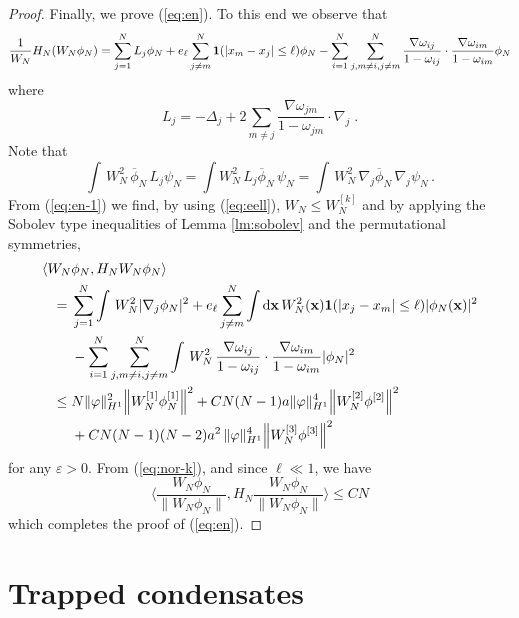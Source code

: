 \documentclass[11pt]{article}
\newcommand{\rd}{{\rm d}}
\newcommand{\bx}{{\bf x}}
\newcommand{\ph}{\varphi}
\newcommand{\e}{\varepsilon}
\begin{document}
\begin{proof}
Finally, we prove (\ref{eq:en}). To this end we observe that
\begin{equation}\label{eq:en-1}
\frac{1}{W_N} H_N (W_N \phi_N) = \sum_{j=1}^N L_j \phi_N + e_{\ell}
\sum_{j \neq m}^N  {\bf 1} (|x_m -x_j| \leq \ell) \phi_N -
\sum_{i=1}^N \sum_{j,m \neq i, j\neq m}^N
\frac{\nabla\omega_{ij}}{1-\omega_{ij}} \cdot
\frac{\nabla\omega_{im}}{1-\omega_{im}} \phi_N \end{equation}
 where
\[ L_j = -\Delta_j + 2\sum_{m \neq j}
\frac{\nabla\omega_{jm}}{1-\omega_{jm}} \cdot \nabla_j \; .\] Note
that
\[
\int \, W_N^2 \, \overline{\phi}_N \, L_j \psi_N  = \int  W_N^2 \,
L_j \overline{\phi}_N \, \psi_N = \int \, W_N^2  \, \nabla_j
\overline{\phi}_N \, \nabla_j \psi_N \,.
\]
{F}rom (\ref{eq:en-1}) we find, by using (\ref{eq:eell}), $W_N\leq
W_N^{[k]}$ and by applying the Sobolev type inequalities of Lemma
\ref{lm:sobolev} and the permutational symmetries,
\begin{equation}
\begin{split}
\langle W_N &\phi_N, H_N W_N \phi_N \rangle  \\ = \; &\sum_{j=1}^N
\int  \, W_N^2  |\nabla_j \phi_N |^2 + e_{\ell}
\sum_{j\neq m}^N \int \rd \bx \, W_N^2 (\bx) {\bf 1} (|x_j -x_m|
\leq \ell) |\phi_N(\bx)|^2 \\& - \sum_{i=1}^N \sum_{j,m \neq i,
j\neq m}^N \int  \, W_N^2  \,
\frac{\nabla\omega_{ij}}{1-\omega_{ij}} \cdot
\frac{\nabla\omega_{im}}{1-\omega_{im}} |\phi_N |^2 \\
\leq \;&N \| \ph \|_{H^1}^2 \Big\| W_N^{[1]} \phi_N^{[1]} \Big\|^2 +
C N(N-1) a \| \ph \|_{H^1}^4 \Big\| W^{[2]}_N\phi^{[2]}\Big\|^2 \\
&+ CN(N-1)(N-2) a^2 \, \| \ph \|_{H^1}^4 \Big\|
W^{[3]}_N\phi^{[3]}\Big\|^2
\end{split}
\end{equation}
for any $\e >0$. {F}rom (\ref{eq:nor-k}), and since $\ell \ll 1$, we
have
\begin{equation}
\Big \langle \frac{W_N \phi_N}{\| W_N \phi_N\|}, H_N \frac{W_N
\phi_N}{\| W_N \phi_N\|} \Big\rangle \leq C N
\end{equation}
which completes the proof of (\ref{eq:en}).
\end{proof}


\section{Trapped condensates}
\label{sec:trap}
\end{document}
